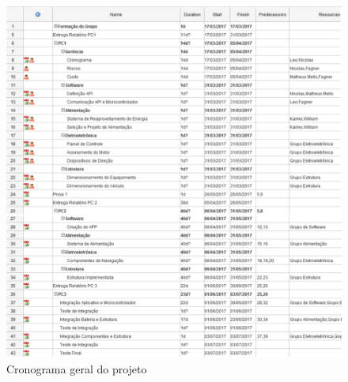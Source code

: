 	\graphicspath{{figuras/}}
	\begin{figure}[h!]
	\centering
	\includegraphics[scale=0.80]{cronograma_geral}
	\caption{Cronograma geral do projeto}
	\label{img:cronograma_geral}
	\end{figure}